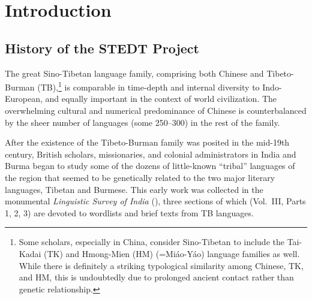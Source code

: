 \vspace{0.25em}


\renewcommand{\thefootnote}{\arabic{footnote}}
\setcounter{footnote}{0}

\chapter*{Introduction}

\nocite{MMW,HOD1857,TBME-DED,DB-DBF,ACK-GTL,EWC-Ao,JHL-GDL,NS-KED,JNC-SED,CLA1911,WP-TNgd,WS-TCW,GHC-SFPST,JPM-Ao,JHH-Sema,JPM-Reng,PKB-SIL,RB-AFS,GHL-DDAL,RLT-IAD,RAM-Maru,HS-TWPD,PKB-STR,NCB-TFG,EP-CSOC,MVS-GTL,KBK-SOA,LST-Lamet,LI1977,JAM-Rhino,JAM-GDL,WS-TIC,PKB-STAL,PM-SinoThai,YM-Lawa,PFY-KL,OED1971,JAM-Chew,GD-PW,SVD-Lim,PKB-QM,AHD1981,PKB-FEN,GHL-CWL,NCB-PCST,AS-DEZC,GD-DOM,GT-BCT,PFY-AJM,JAM-STPS,MN-CDT,PKB-TCKT,JAM-NSTR,RSB-WBN,JAM-DD,PKB-GFC,MLC-MED,RLS-PDMN,RSC-ECC,LY-EPTL,WHBLS-WFOC,LS-ROC,LS-RHPTB,MKCD,ZJH-OCmed,LSWHB-OCNm,JAM-TEB,LXL-WRZ,SI-MED,BMMM-PNLB,CLA1911}

\section{History of the STEDT Project}

The great Sino-Tibetan language family, comprising both Chinese and Tibeto-Burman (TB),\footnote{Some scholars, especially in China, consider Sino-Tibetan to include the Tai-Kadai (TK) and Hmong-Mien (HM) (=Mi\'ao-Y\'ao) language families as well.  While there is definitely a striking typological similarity among Chinese, TK, and HM, this is undoubtedly due to prolonged ancient contact rather than genetic relationship.} is comparable in time-depth and internal diversity to Indo-European, and equally important in the context of world civilization. The overwhelming cultural and numerical predominance of Chinese is counterbalanced by the sheer number of languages (some 250–300) in the rest of the family.

After the existence of the Tibeto-Burman family was posited in the mid-19th century, British scholars, missionaries, and colonial administrators in India and Burma began to study some of the dozens of little-known “tribal” languages of the region that seemed to be genetically related to the two major literary languages, Tibetan and Burmese. This early work was collected in the monumental \textit{Linguistic Survey of India} (\citealt{LSI}), three sections of which (Vol.~III, Parts 1, 2, 3) are devoted to wordlists and brief texts from TB languages.

